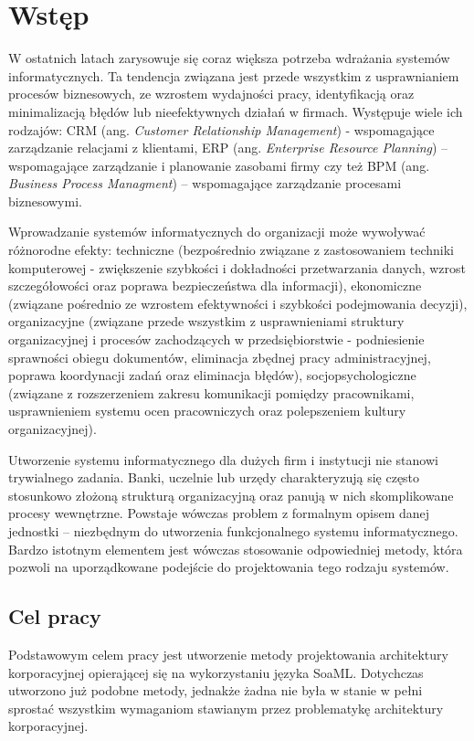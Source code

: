 \chapter{Wstęp}
W ostatnich latach zarysowuje się coraz większa potrzeba wdrażania systemów informatycznych. Ta tendencja związana  jest przede wszystkim z usprawnianiem procesów biznesowych, ze wzrostem wydajności pracy, identyfikacją oraz minimalizacją błędów lub nieefektywnych działań w firmach. Występuje wiele ich rodzajów: CRM (ang. \emph{Customer Relationship Management}) - wspomagające zarządzanie relacjami z klientami, ERP (ang. \emph{Enterprise Resource Planning}) – wspomagające zarządzanie i planowanie zasobami firmy czy też BPM (ang. \emph{Business Process Managment}) – wspomagające zarządzanie procesami biznesowymi. 

Wprowadzanie systemów informatycznych do organizacji może wywoływać różnorodne efekty: techniczne (bezpośrednio związane z zastosowaniem techniki komputerowej - zwiększenie szybkości i dokładności przetwarzania danych, wzrost szczegółowości oraz poprawa bezpieczeństwa dla informacji), ekonomiczne (związane pośrednio ze wzrostem efektywności i szybkości podejmowania decyzji), organizacyjne (związane przede wszystkim z usprawnieniami struktury organizacyjnej i procesów zachodzących w przedsiębiorstwie - podniesienie sprawności obiegu dokumentów, eliminacja zbędnej pracy administracyjnej, poprawa koordynacji zadań oraz eliminacja błędów), socjopsychologiczne (związane z rozszerzeniem zakresu komunikacji pomiędzy pracownikami, usprawnieniem systemu ocen pracowniczych oraz polepszeniem kultury organizacyjnej). \cite{EfektyZasSys}

Utworzenie systemu informatycznego dla dużych firm i instytucji nie stanowi trywialnego zadania. Banki, uczelnie lub urzędy charakteryzują się często stosunkowo złożoną strukturą organizacyjną oraz panują w nich skomplikowane procesy wewnętrzne. Powstaje wówczas problem z formalnym opisem danej jednostki – niezbędnym do utworzenia funkcjonalnego systemu informatycznego. Bardzo istotnym elementem jest wówczas stosowanie odpowiedniej metody, która pozwoli na uporządkowane podejście do projektowania tego rodzaju systemów. 

\section{Cel pracy}
Podstawowym celem pracy jest utworzenie metody projektowania architektury korporacyjnej opierającej się na wykorzystaniu języka SoaML. Dotychczas utworzono już podobne metody, jednakże żadna nie była w stanie w pełni sprostać wszystkim wymaganiom stawianym przez problematykę architektury korporacyjnej.

